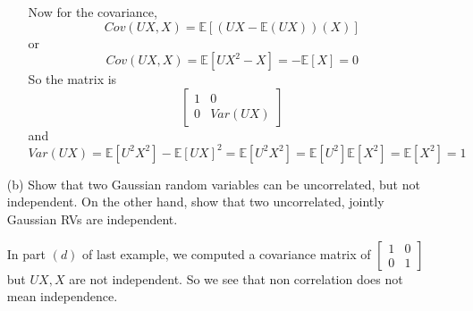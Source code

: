 \documentclass{article}
\begin{document}
\begin{itemize}
\begin{itemize}
\begin{answer}
                        Now for the covariance, 
                            \begin{equation*}
                                Cov(UX, X) = \mathbb{E}[(UX - \mathbb{E}(UX))(X)]
                            \end{equation*}
                        or
                            \begin{equation*}
                                Cov(UX, X) = \mathbb{E}[UX^{2} - X] = -\mathbb{E}[X] = 0
                            \end{equation*}
                        So the matrix is 
                            \begin{equation*}
                                \begin{bmatrix}
                                    1 & 0       \\
                                    0 & Var(UX)   
                                \end{bmatrix}
                            \end{equation*}
                        and
                            \begin{equation*}
                                Var(UX) = \mathbb{E}[U^{2}X^{2}] - \mathbb{E}[UX]^{2} = \mathbb{E}[U^{2}X^{2}] = \mathbb{E}[U^{2}]\mathbb{E}[X^{2}] = \mathbb{E}[X^{2}] = 1
                            \end{equation*}
                    \end{answer}
            \end{itemize}

        \item [(b)] Show that two Gaussian random variables can be uncorrelated, but not independent. On the other hand, show that two uncorrelated, jointly Gaussian RVs are independent.
            \begin{answer}
                In part $(d)$ of last example, we computed a covariance matrix of $\begin{bmatrix}
                    1 & 0 \\
                    0 & 1   
                \end{bmatrix}$ but $UX, X$ are not independent. So we see that non correlation does not mean independence.


\end{answer}
\end{itemize}
\end{document}
